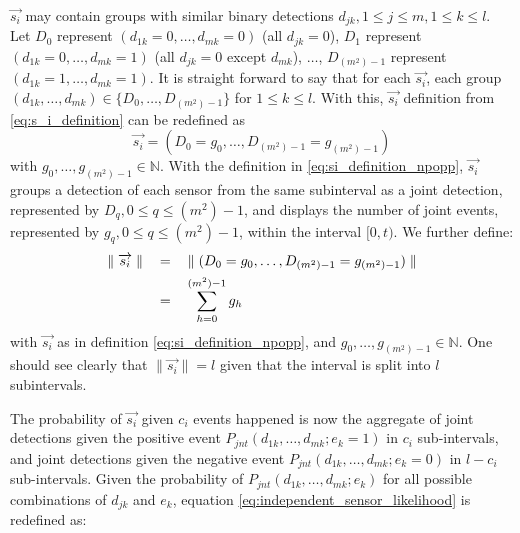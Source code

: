 $\overrightarrow{s_i}$ may contain groups with similar binary detections $d_{jk}, 1 \leq j \leq m, 1 \leq k \leq l$. Let $D_0$ represent $(d_{1k} = 0, \ldots, d_{mk} = 0)$ (all $d_{jk} = 0$), $D_1$ represent $(d_{1k} = 0, \ldots, d_{mk} = 1)$ (all $d_{jk} = 0$ except $d_{mk}$), $\ldots$, $D_{(m^2) - 1}$ represent $(d_{1k} = 1, \ldots, d_{mk} = 1)$. It is straight forward to say that for each $\overrightarrow{s_i}$, each group $(d_{1k}, \ldots, d_{mk}) \in \big \{D_0, \ldots, D_{(m^2)-1} \big \}$ for $1 \leq k \leq l$. With this, $\overrightarrow{s_i}$ definition from \ref{eq:s_i_definition} can be redefined as
\begin{equation}
    \label{eq:si_definition_npopp}
    \overrightarrow{s_i} = (D_0 = g_0, \ldots, D_{(m^2) - 1} = g_{(m^2) - 1})
\end{equation}
\noindent with $g_0, \ldots, g_{(m^2) - 1} \in \mathbb{N}$. With the definition in \ref{eq:si_definition_npopp}, $\overrightarrow{s_i}$ groups a detection of each sensor from the same subinterval as a joint detection, represented by $D_q, 0 \leq q \leq (m^2) -1$, and displays the number of joint events, represented by $g_q, 0 \leq q \leq (m^2) -1$, within the interval $[0, t)$. We further define:
\begin{equation}
    \label{eq:abs_si_definition_npopp}
    \begin{tabular}{rcl}
        $\parallel \overrightarrow{s_i} \parallel$ & = & $\parallel (D_0 = g_0, \ldots, D_{(m^2) - 1} = g_{(m^2) - 1}) \parallel$ \\ [1ex]
                                                   & = & $\displaystyle\sum_{h=0}^{(m^2)-1} g_h$
    \end{tabular}
\end{equation}
with $\overrightarrow{s_i}$ as in definition \ref{eq:si_definition_npopp}, and $g_0, \ldots, g_{(m^2) - 1} \in \mathbb{N}$. One should see clearly that $\parallel \overrightarrow{s_i} \parallel = l$ given that the interval is split into $l$ subintervals.

The probability of $\overrightarrow{s_i}$ given $c_i$ events happened is now the aggregate of joint detections given the positive event $P_{jnt}(d_{1k}, \ldots, d_{mk} ; e_k=1)$ in $c_i$ sub-intervals, and joint detections given the negative event $P_{jnt}(d_{1k}, \ldots, d_{mk} ; e_k=0)$ in $l-c_i$ sub-intervals. Given the probability of $P_{jnt}(d_{1k}, \ldots, d_{mk} ; e_k)$ for all possible combinations of $d_{jk}$ and $e_k$, equation \ref{eq:independent_sensor_likelihood} is redefined as:

